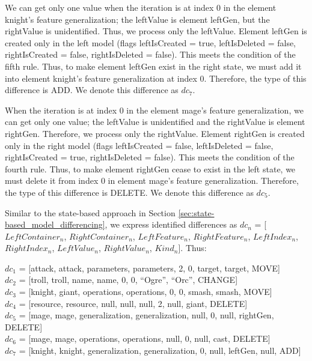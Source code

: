We can get only one value when the iteration is at index 0 in the element \textsf{knight}’s feature \textsf{generalization}; the \textsf{leftValue} is element \textsf{leftGen}, but the \textsf{rightValue} is unidentified. Thus, we process only the \textsf{leftValue}. Element \textsf{leftGen} is created only in the left model (flags \textsf{leftIsCreated} = true, \textsf{leftIsDeleted} = false, \textsf{rightIsCreated} = false, \textsf{rightIsDeleted} = false). This meets the condition of the fifth rule. Thus, to make element \textsf{leftGen} exist in the right state, we must add it into element \textsf{knight}’s feature \textsf{generalization} at index 0. Therefore, the type of this difference is \textsf{ADD}. We denote this difference as $dc_{7}$.

When the iteration is at index 0 in the element \textsf{mage}’s feature \textsf{generalization}, we can get only one value; the \textsf{leftValue} is unidentified and the \textsf{rightValue} is element \textsf{rightGen}. Therefore, we process only the \textsf{rightValue}. Element \textsf{rightGen} is created only in the right model (flags \textsf{leftIsCreated} = false, \textsf{leftIsDeleted} = false, \textsf{rightIsCreated} = true, \textsf{rightIsDeleted} = false). This meets the condition of the fourth rule. Thus, to make element \textsf{rightGen} cease to exist in the left state, we must delete it from index 0 in element \textsf{mage}’s feature \textsf{generalization}. Therefore, the type of this difference is \textsf{DELETE}. We denote this difference as $dc_{5}$.



Similar to the state-based approach in Section \ref{sec:state-based_model_differencing}, we express identified differences as $dc_{n}$ = [$LeftContainer_n$, $RightContainer_n$, $LeftFeature_n$, $RightFeature_n$, $LeftIndex_n$, $RightIndex_n$, $LeftValue_n$, $RightValue_n$, $Kind_n$]. Thus:

$dc_{1}$ = [\textsf{attack}, \textsf{attack}, \textsf{parameters}, \textsf{parameters}, 2, 0, \textsf{target}, \textsf{target}, \textsf{MOVE}]\\
$dc_{2}$ = [\textsf{troll}, \textsf{troll}, \textsf{name}, \textsf{name}, 0, 0, “Ogre”, “Orc”, \textsf{CHANGE}]\\
$dc_{3}$ = [\textsf{knight}, \textsf{giant}, \textsf{operations}, \textsf{operations}, 0, 0, \textsf{smash}, \textsf{smash}, \textsf{MOVE}]\\
$dc_{4}$ = [\textsf{resource}, \textsf{resource}, \textsf{null}, \textsf{null}, \textsf{null}, 2, \textsf{null}, \textsf{giant}, \textsf{DELETE}]\\
$dc_{5}$ = [\textsf{mage}, \textsf{mage}, \textsf{generalization}, \textsf{generalization}, \textsf{null}, 0, \textsf{null}, \textsf{rightGen}, \textsf{DELETE}] \\
$dc_{6}$ = [\textsf{mage}, \textsf{mage}, \textsf{operations}, \textsf{operations}, \textsf{null}, 0, \textsf{null}, \textsf{cast}, \textsf{DELETE}]\\
$dc_{7}$ = [\textsf{knight}, \textsf{knight}, \textsf{generalization}, \textsf{generalization}, 0, \textsf{null}, \textsf{leftGen}, \textsf{null}, \textsf{ADD}]

